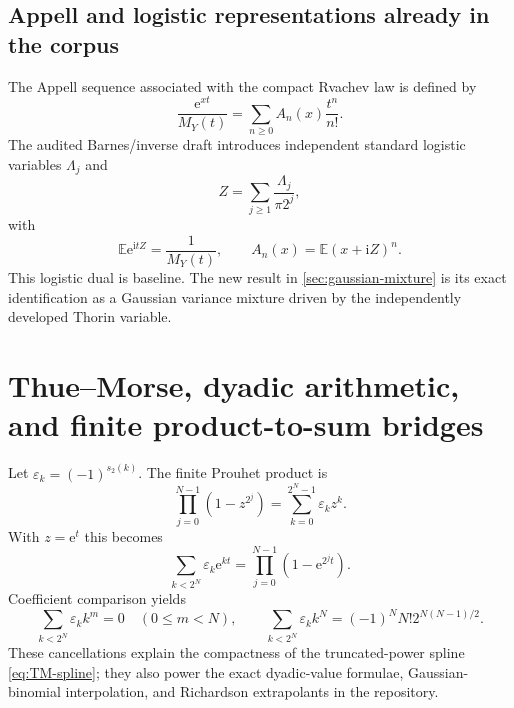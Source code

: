\documentclass[11pt,oneside]{article}
\theoremstyle{definition}
\theoremstyle{remark}
\newcommand{\E}{\mathbb E}
\newcommand{\e}{\mathrm e}
\newcommand{\ii}{\mathrm i}
\newcommand{\wt}{s_2}
\begin{document}
\subsection{Appell and logistic representations already in the corpus}

The Appell sequence associated with the compact Rvachev law is defined by
\begin{equation}
 \frac{\e^{xt}}{M_Y(t)}=\sum_{n\ge0}A_n(x)\frac{t^n}{n!}. \label{eq:Appell}
\end{equation}
The audited Barnes/inverse draft introduces independent standard logistic variables
$\Lambda_j$ and
\begin{equation}
 Z=\sum_{j\ge1}\frac{\Lambda_j}{\pi2^j},                 \label{eq:logistic-Z}
\end{equation}
with
\begin{equation}
 \E\e^{\ii tZ}=\frac{1}{M_Y(t)},
 \qquad
 A_n(x)=\E(x+\ii Z)^n.                                   \label{eq:logistic-dual-baseline}
\end{equation}
This logistic dual is baseline.  The new result in \cref{sec:gaussian-mixture} is its exact
identification as a Gaussian variance mixture driven by the independently developed Thorin
variable.

\section{Thue--Morse, dyadic arithmetic, and finite product-to-sum bridges}
\label{sec:thue-morse}

Let $\varepsilon_k=(-1)^{\wt(k)}$.  The finite Prouhet product is
\begin{equation}
 \prod_{j=0}^{N-1}(1-z^{2^j})
 =\sum_{k=0}^{2^N-1}\varepsilon_kz^k.                    \label{eq:Prouhet-product}
\end{equation}
With $z=\e^t$ this becomes
\begin{equation}
 \sum_{k<2^N}\varepsilon_k\e^{kt}
 =\prod_{j=0}^{N-1}(1-\e^{2^jt}).                         \label{eq:Prouhet-exponential}
\end{equation}
Coefficient comparison yields
\begin{equation}
 \sum_{k<2^N}\varepsilon_kk^m=0\quad(0\le m<N),
 \qquad
 \sum_{k<2^N}\varepsilon_kk^N
 =(-1)^NN!2^{N(N-1)/2}.                                  \label{eq:Prouhet-sharp}
\end{equation}
These cancellations explain the compactness of the truncated-power spline
\eqref{eq:TM-spline}; they also power the exact dyadic-value formulae, Gaussian-binomial
interpolation, and Richardson extrapolants in the repository.
\end{document}
